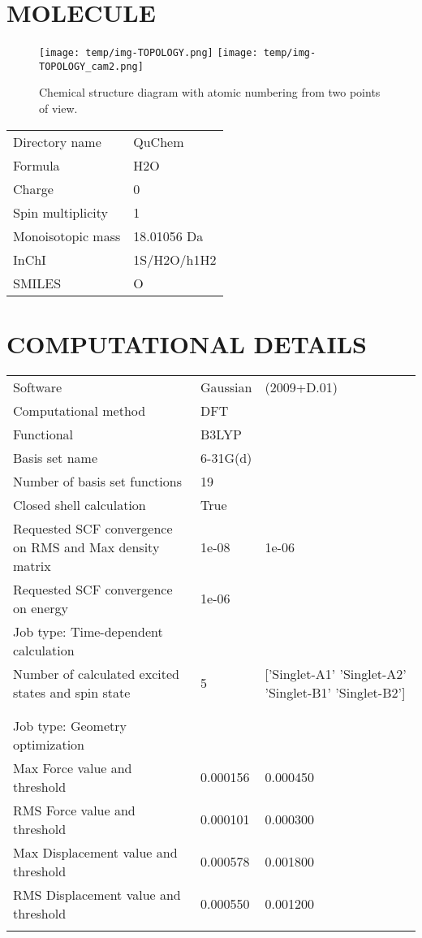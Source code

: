 \documentclass{article}%
\begin{document}
%
\small%
\section{MOLECULE}%
\label{sec:MOLECULE}%
\begin{figure}[h]%
\begin{center}%
\texttt{[image: temp/img-TOPOLOGY.png]}%
\texttt{[image: temp/img-TOPOLOGY\_cam2.png]}%
\end{center}%
\vspace{-5mm}%
\caption{Chemical structure diagram with atomic numbering from two points of view.}%
\end{figure}%
\begin{tabularx}{\textwidth}{|l X|}%
Directory name&QuChem\\%
Formula&H2O\\%
Charge&0\\%
Spin multiplicity&1\\%
Monoisotopic mass&18.01056 Da\\%
InChI&1S/H2O/h1H2\\%
SMILES&O\\%
\end{tabularx}

%
\section{COMPUTATIONAL DETAILS}%
\label{sec:COMPUTATIONALDETAILS}%
\begin{tabularx}{\textwidth}{|l X| X|}%
Software&Gaussian&(2009+D.01)\\%
Computational method&DFT& \\%
Functional&B3LYP& \\%
Basis set name&6{-}31G(d)& \\%
Number of basis set functions&19& \\%
Closed shell calculation&True& \\%
Requested SCF convergence on RMS and Max density matrix&1e{-}08&1e{-}06\\%
Requested SCF convergence on energy&1e{-}06& \\%
Job type: Time{-}dependent calculation& & \\%
Number of calculated excited states and spin state&5&{[}'Singlet{-}A1' 'Singlet{-}A2' 'Singlet{-}B1' 'Singlet{-}B2'{]}\\%
 & & \\%
 & & \\%
Job type: Geometry optimization& & \\%
Max Force value and threshold&0.000156&0.000450\\%
RMS Force value and threshold&0.000101&0.000300\\%
Max Displacement value and threshold&0.000578&0.001800\\%
RMS Displacement value and threshold&0.000550&0.001200\\%
 & & \\%
\end{tabularx}
\end{document}
